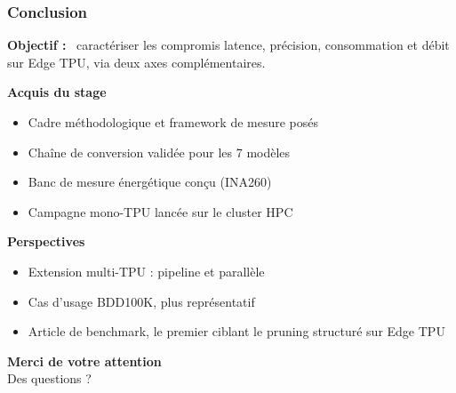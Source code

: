 \documentclass[
	11pt,
]{beamer}
\newcommand{\ititle}[1]{\textbf{#1 :}~}
\begin{document}
{
\begin{frame}
	\frametitle{Conclusion}

	\footnotesize
	\vspace{0.4em}
	\ititle{Objectif} caractériser les compromis latence, précision,
	consommation et débit sur Edge TPU, via deux axes complémentaires.

	\vspace{0.7em}
	\textbf{Acquis du stage}
	\begin{itemize}
		\item Cadre méthodologique et framework de mesure posés
		\item Chaîne de conversion validée pour les 7 modèles
		\item Banc de mesure énergétique conçu (INA260)
		\item Campagne mono-TPU lancée sur le cluster HPC
	\end{itemize}

	\vspace{0.6em}
	\textbf{Perspectives}
	\begin{itemize}
		\item Extension multi-TPU : pipeline et parallèle
		\item Cas d'usage BDD100K, plus représentatif
		\item Article de benchmark, le premier ciblant le pruning
		      structuré sur Edge TPU
	\end{itemize}
\end{frame}
}
{
\begin{frame}
	\vfill
	\begin{center}
		{\Large\textbf{Merci de votre attention}}
		\\[1.2em]
		{\footnotesize Des questions ?}
	\end{center}
	\vfill
\end{frame}
}

\end{document}
